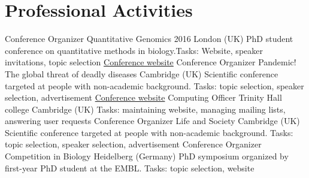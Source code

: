 \documentclass[11pt,a4paper]{moderncv}
\newcommand\chref[3][magenta]{\href{#2}{\small\color{#1}#3}}
\begin{document}
\section{Professional Activities}
         {Conference Organizer}
         {\hfill\break Quantitative Genomics 2016}
         {London (UK)}
         {\hfill\break PhD student conference on quantitative methods in biology.\hfill\break Tasks: Website, speaker invitations, topic selection}
         {\chref{http://quantitative-genomics.com/}{Conference website}}
         {Conference Organizer}
         {Pandemic! The global threat of deadly diseases}
         {Cambridge (UK)}
         {\hfill\break Scientific conference targeted at people with non-academic background.
          \hfill\break Tasks: topic selection, speaker selection, advertisement}
         {\chref{http://www.ebi.ac.uk/about/events/science-and-society-2015}{Conference website}}
         {Computing Officer}
         {\hfill\break Trinity Hall college}
         {Cambridge (UK)}
         {\hfill\break Tasks: maintaining website, managing mailing lists, answering user requests}
         {}
         {Conference Organizer}
         {Life and Society}
         {Cambridge (UK)}
         {\hfill\break Scientific conference targeted at people with non-academic background.
          \hfill\break Tasks: topic selection, speaker selection, advertisement}
         {}
         {Conference Organizer}
         {Competition in Biology}
         {Heidelberg (Germany)}
         {\hfill\break PhD symposium organized by first-year PhD student at the EMBL.
          \hfill\break Tasks: topic selection, website}
         {}
\end{document}
